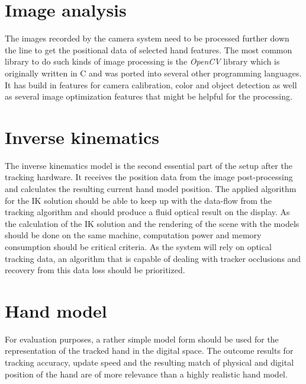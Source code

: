 \section{Image analysis}
The images recorded by the camera system need to be processed further down the line to get the positional data of selected hand features. The most common library to do such kinds of image processing is the \textit{OpenCV}\cite{OpenCVTeam.2018} library which is originally written in C and was ported into several other programming languages. It has build in features for camera calibration, color and object detection as well as several image optimization features that might be helpful for the processing.
\section{Inverse kinematics}
The inverse kinematics model is the second essential part of the setup after the tracking hardware. It receives the position data from the image post-processing and calculates the resulting current hand model position. The applied algorithm for the IK solution should be able to keep up with the data-flow from the tracking algorithm and should produce a fluid optical result on the display. As the calculation of the IK solution and the rendering of the scene with the models should be done on the same machine, computation power and memory consumption should be critical criteria. As the system will rely on optical tracking data, an algorithm that is capable of dealing with tracker occlusions and recovery from this data loss should be prioritized. 
\section{Hand model}
For evaluation purposes, a rather simple model form should be used for the representation of the tracked hand in the digital space. The outcome results for tracking accuracy, update speed and the resulting match of physical and digital position of the hand are of more relevance than a highly realistic hand model.
 